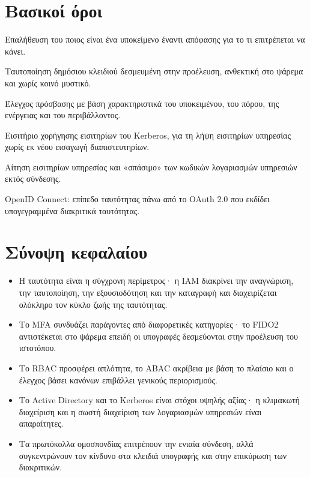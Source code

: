 \documentclass[11pt,openany]{book}
\begin{document}
\section*{Βασικοί όροι}
\begin{description}[style=nextline,leftmargin=1.2em]
  \item[Ταυτοποίηση έναντι εξουσιοδότησης] Επαλήθευση του ποιος είναι ένα υποκείμενο έναντι απόφασης για το τι επιτρέπεται να κάνει.
  \item[FIDO2 / passkey] Ταυτοποίηση δημόσιου κλειδιού δεσμευμένη στην προέλευση, ανθεκτική στο ψάρεμα και χωρίς κοινό μυστικό.
  \item[ABAC] Έλεγχος πρόσβασης με βάση χαρακτηριστικά του υποκειμένου, του πόρου, της ενέργειας και του περιβάλλοντος.
  \item[TGT] Εισιτήριο χορήγησης εισιτηρίων του Kerberos, για τη λήψη εισιτηρίων υπηρεσίας χωρίς εκ νέου εισαγωγή διαπιστευτηρίων.
  \item[Kerberoasting] Αίτηση εισιτηρίων υπηρεσίας και «σπάσιμο» των κωδικών λογαριασμών υπηρεσιών εκτός σύνδεσης.
  \item[OIDC] OpenID Connect: επίπεδο ταυτότητας πάνω από το OAuth 2.0 που εκδίδει υπογεγραμμένα διακριτικά ταυτότητας.
\end{description}

\section*{Σύνοψη κεφαλαίου}
\begin{itemize}
  \item Η ταυτότητα είναι η σύγχρονη περίμετρος· η IAM διακρίνει την αναγνώριση, την ταυτοποίηση, την εξουσιοδότηση και την καταγραφή και διαχειρίζεται ολόκληρο τον κύκλο ζωής της ταυτότητας.
  \item Το MFA συνδυάζει παράγοντες από διαφορετικές κατηγορίες· το FIDO2 αντιστέκεται στο ψάρεμα επειδή οι υπογραφές δεσμεύονται στην προέλευση του ιστοτόπου.
  \item Το RBAC προσφέρει απλότητα, το ABAC ακρίβεια με βάση το πλαίσιο και ο έλεγχος βάσει κανόνων επιβάλλει γενικούς περιορισμούς.
  \item Το Active Directory και το Kerberos είναι στόχοι υψηλής αξίας· η κλιμακωτή διαχείριση και η σωστή διαχείριση των λογαριασμών υπηρεσιών είναι απαραίτητες.
  \item Τα πρωτόκολλα ομοσπονδίας επιτρέπουν την ενιαία σύνδεση, αλλά συγκεντρώνουν τον κίνδυνο στα κλειδιά υπογραφής και στην επικύρωση των διακριτικών.
\end{itemize}
\end{document}
